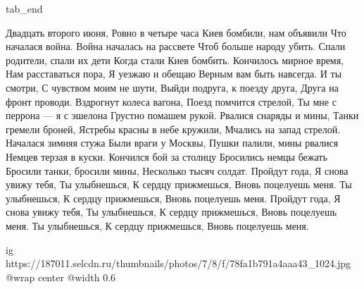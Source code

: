  tab_end
\fi

\raggedcolumns
\begin{multicols}{3} %
\setlength{\parindent}{0pt}

\obeycr
Двадцать второго июня,
Ровно в четыре часа
Киев бомбили, нам объявили
Что началася война.
\smallskip
Война началась на рассвете
Чтоб больше народу убить.
Спали родители, спали их дети
Когда стали Киев бомбить.
\smallskip
Кончилось мирное время,
Нам расставаться пора,
Я уезжаю и обещаю
Верным вам быть навсегда.
\smallskip
И ты смотри,
С чувством моим не шути,
Выйди подруга, к поезду друга,
Друга на фронт проводи.
\smallskip
Вздрогнут колеса вагона,
Поезд помчится стрелой,
Ты мне с перрона — я с эшелона
Грустно помашем рукой.
\smallskip
Рвалися снаряды и мины,
Танки гремели броней,
Ястребы красны в небе кружили,
Мчались на запад стрелой.
\smallskip
Началася зимняя стужа
Были враги у Москвы,
Пушки палили, мины рвалися
Немцев терзая в куски.
\smallskip
Кончился бой за столицу
Бросились немцы бежать
Бросили танки, бросили мины,
Несколько тысяч солдат.
\smallskip
Пройдут года,
Я снова увижу тебя,
Ты улыбнешься,
К сердцу прижмешься,
Вновь поцелуешь меня.
Ты улыбнешься,
К сердцу прижмешься,
Вновь поцелуешь меня.
\smallskip
Пройдут года,
Я снова увижу тебя,
Ты улыбнешься,
К сердцу прижмешься,
Вновь поцелуешь меня.
Ты улыбнешься,
К сердцу прижмешься,
Вновь поцелуешь меня. 
\restorecr
\end{multicols} %

\ifcmt
  ig https://187011.selcdn.ru/thumbnails/photos/7/8/f/78fa1b791a4aaa43_1024.jpg
  @wrap center
  @width 0.6
\fi
